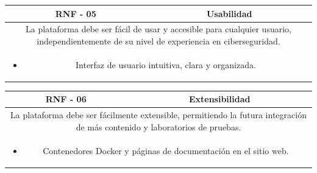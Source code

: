             \begin{table}[!htbp]
                \centering
                \begin{tabular}{|c|c|}
                    \hline
                    \textbf{RNF - 05} & \textbf{Usabilidad} \\
                    \hline
                    \multicolumn{2}{|p{15cm}|}{
                        La plataforma debe ser fácil de usar y accesible para cualquier usuario, independientemente de su nivel de experiencia en ciberseguridad.
                    } \\
                    \hline
                    \multicolumn{2}{|p{15cm}|}{
                        \begin{itemize}
                            \item Interfaz de usuario intuitiva, clara y organizada.
                        \end{itemize}
                        } \\
                    \hline
                \end{tabular}
                \label{tab:RNF5}
            \end{table}
            
            \begin{table}[H]
                \centering
                \begin{tabular}{|c|c|}
                    \hline
                    \textbf{RNF - 06} & \textbf{Extensibilidad} \\
                    \hline
                    \multicolumn{2}{|p{15cm}|}{
                        La plataforma debe ser fácilmente extensible, permitiendo la futura integración de más contenido y laboratorios de pruebas.
                    } \\
                    \hline
                    \multicolumn{2}{|p{15cm}|}{
                        \begin{itemize}
                            \item Contenedores Docker y páginas de documentación en el sitio web.
                        \end{itemize}
                        } \\
                    \hline
                \end{tabular}
                \label{tab:RNF6}
            \end{table}
            
            \cleardoublepage
    
